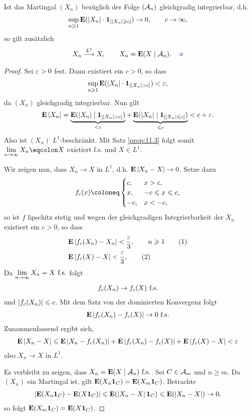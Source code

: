 \begin{propn}
Ist das Martingal $(X_n)$ bezüglich der Folge $(\AA_n)$ gleichgradig
integrierbar, d.h.
\begin{align*}
\sup\limits_{n\ge 1} \E(\abs{X_n}\cdot \Id_{[\abs{X_n}\ge c]}) \to 0,\qquad
c\to \infty,
\end{align*}
so gilt zusätzlich
\begin{align*}
X_n\overset{L^1}{\longrightarrow} X,\qquad X_n = \E(X\mid \AA_n).\fishhere
\end{align*}
\end{propn}
\begin{proof}
Sei $\ep > 0$ fest. Dann existiert ein $c > 0$, so dass
\begin{align*}
\sup_{n\ge 1} \E(\abs{X_n}\cdot \Id_{[\abs{X_n} > c]}) < \ep,
\end{align*}
da $(X_n)$ gleichgradig integrierbar. Nun gilt
\begin{align*}
\E\abs{X_n} = \underbrace{\E(\abs{X_n}\mid\Id_{[\abs{X_n}>c]})}_{<\ep}
+\underbrace{\E(\abs{X_n}\mid\Id_{[\abs{X_n}\le c]})}_{\le c}
< c + \ep.
\end{align*}
Also ist $(X_n)$ $L^1$-beschränkt. Mit Satz \ref{prop:11.3} folgt somit
$\lim\limits_{n\to\infty} X_n \defr X$ existiert f.s. und $X\in L^1$.

Wir zeigen nun, dass $X_n\to X$ in $L^1$, d.h. $\E\abs{X_n-X}\to 0$. Setze
dazu
\begin{align*}
f_c(x) \defl  
\begin{cases}
c, & x > c,\\
x, & -c\le x \le c,\\
-c, & x < -c,
\end{cases}
\end{align*}
so ist $f$ lipschitz stetig und wegen der gleichgradigen Integrierbarkeit der
$X_n$ existiert ein $c>0$, so dass
\begin{align*}
&\E\abs{f_c(X_n)-X_n} < \frac{\ep}{3},\qquad n\ge 1\tag{1}\\
&\E\abs{f_c(X)-X} < \frac{\ep}{3},\tag{2}
\end{align*}
Da $\lim\limits_{n\to\infty} X_n = X\fs$ folgt
\begin{align*}
f_c(X_n)\to f_c(X)\fs
\end{align*}
und $\abs{f_c(X_n)} \le c$. Mit dem Satz von der dominierten Konvergenz folgt
\begin{align*}
\E\abs{f_c(X_n)-f_c(X)}\to 0\fs
\end{align*}
Zusammenfassend ergibt sich,
\begin{align*}
\E\abs{X_n-X} \le \E\abs{X_n-f_c(X_n)} + \E\abs{f_c(X_n)-f_c(X)}
+ \E\abs{f_c(X)-X} < \ep
\end{align*}
also $X_n\to X$ in $L^1$.

Es verbleibt zu zeigen, dass $X_n = \E(X\mid\AA_n)\fs$.
Sei $C\in\AA_m$ und $n\ge m$. Da $(X_n)$ ein Martingal ist, gilt $\E(X_n
\Id_{C}) = \E(X_m \Id_C)$. Betrachte
\begin{align*}
\abs{\E(X_n\Id_C) - \E(X\Id_C)}
\le
\E(\abs{X_n-X}\Id_C)
\le
\E(\abs{X_n-X})\to 0,
\end{align*}
so folgt $\E (X_m \Id_C) = \E (X\Id_C)$.\qedhere
\end{proof}

